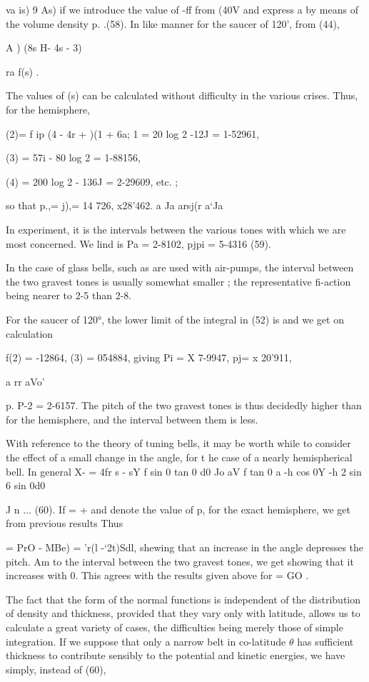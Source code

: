  va is) 9  As) if we introduce the value of -ff from (40V and express a by
means of the volume density p.  .(58).  In like manner for the saucer of 120',
from (44),

A ) (8s H- 4s - 3)

ra f(s) .

The values of (s) can be calculated without difficulty in the various crises.
Thus, for the hemisphere,

 (2)= f ip (4 - 4r + )(1 + 6a; 1 = 20 log 2 -12J = 1-52961,

 (3) = 57i - 80 log 2 = 1-88156,

 (4) = 200 log 2 - 136J = 2-29609, etc. ;

so that p.,= j),= 14 726, x28'462.  a Ja  arsj(r  a‘Ja

In experiment, it is the intervals between the various
tones with which we are most concerned. We lind is Pa = 2-8102, pjpi = 5-4316
(59).

In the case of glass bells, such as are used with air-pumps, the interval
between the two gravest tones is usually somewhat smaller ; the representative
fi-action being nearer to 2-5 than 2-8.

For the saucer of 120°, the lower limit of the integral in (52) is and we get
on calculation

f(2) = -12864, (3) = 054884, giving Pi = X 7-9947, pj= x 20'911,

   a rr aVo'

p.  P-2 = 2-6157.  The pitch of the two gravest tones is thus decidedly
higher than for the hemisphere, and the interval between them is less.

With reference to the theory of tuning bells, it may be worth while to consider
the effect of a small change in the angle, for t he case of a nearly
hemispherical bell. In general X- = 4fr s - sY f sin 0 tan  0 d0 Jo aV f tan
0 a -h cos 0Y -h 2 sin 6 sin 0d0

J n ... (60).  If  = + and denote the value of p, for the exact hemisphere,
we get from previous results Thus

= PrO - MBe) = 'r(l -‘2t)Sdl, shewing that an increase in the angle depresses
the pitch. Am to the interval between the two gravest tones, we get showing
that it increases with 0. This agrees with the results given above for = GO .

The fact that the form of the normal functions is independent of the
distribution of density and thickness, provided that they vary only with
latitude, allows us to calculate a great variety of cases, the difficulties
being merely those of simple integration. If we suppose that only a narrow belt
in co-latitude
\(\theta \)
has sufficient thickness to contribute sensibly to the
potential and kinetic energies, we have simply, instead of (60),

